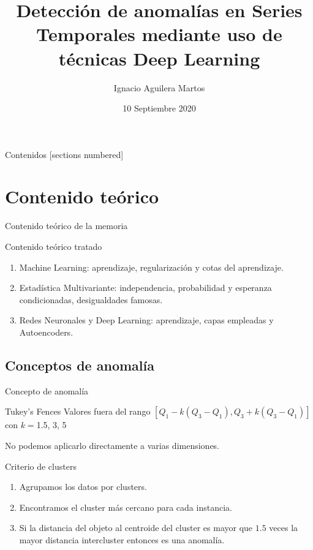 \documentclass[10pt]{beamer}
\title{Detección de anomalías en Series Temporales mediante uso de técnicas Deep Learning}
\author{Ignacio Aguilera Martos}
\date{10 Septiembre 2020}
\institute{Trabajo Fin de Máster \\ \href{https://github.com/nacheteam/DLOD}{Código disponible en GitHub}}
\begin{document}
\maketitle

\begin{frame}[fragile]{Contenidos}
  [sections numbered]
  \tableofcontents
\end{frame}

\section{Contenido teórico}

\begin{frame}[fragile]{Contenido teórico de la memoria}
	\vspace{10px}
	\pause
	
	\begin{block}{Contenido teórico tratado}
		\begin{enumerate}
			\item Machine Learning: aprendizaje, regularización y cotas del aprendizaje.
			\pause
			\item Estadística Multivariante: independencia, probabilidad y esperanza condicionadas, desigualdades famosas.
			\pause
			\item Redes Neuronales y Deep Learning: aprendizaje, capas empleadas y Autoencoders.
		\end{enumerate}
	\end{block}
	
\end{frame}

\subsection{Conceptos de anomalía}

\begin{frame}[fragile]{Concepto de anomalía}
	\vspace{10px}
	\pause
	
	\begin{block}{Tukey's Fences}
		Valores fuera del rango $[Q_1 - k(Q_3 - Q_1), Q_3 + k(Q_3 - Q_1)]$ con $k=$1.5, 3, 5
		
		No podemos aplicarlo directamente a varias dimensiones.
	\end{block}

	\pause

	\begin{block}{Criterio de clusters}
		\begin{enumerate}
			\item Agrupamos los datos por clusters.
			\pause
			\item Encontramos el cluster más cercano para cada instancia.
			\pause
			\item Si la distancia del objeto al centroide del cluster es mayor que $1.5$ veces la mayor
			distancia intercluster entonces es una anomalía.
		\end{enumerate}
	\end{block}
	
\end{frame}
\end{document}
